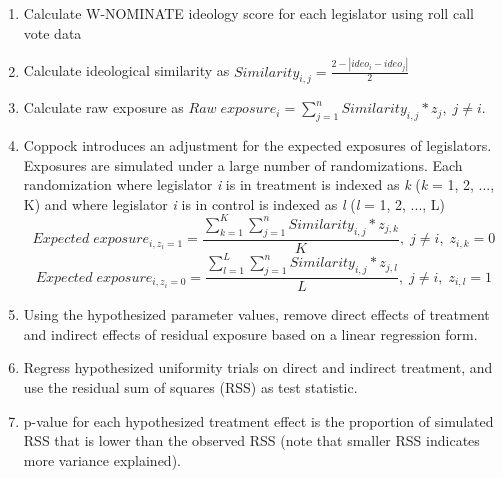 \documentclass[12pt]{article}
\begin{document}
\begin{enumerate}
\item Calculate W-NOMINATE ideology score for each legislator using roll call vote data

\item Calculate ideological similarity as $Similarity_{i,j} = \frac{2 - |ideo_i - ideo_j|}{2}$

\item Calculate raw exposure as $Raw\; exposure_i =  \sum_{j=1}^{n}Similarity_{i,j} * z_j, \; j \neq i$. 

\item Coppock introduces an adjustment for the expected exposures of legislators. Exposures are simulated under a large number of randomizations. Each randomization where legislator \textit{i} is in treatment is indexed as \textit{k} (\textit{k} = 1, 2, ..., K) and where legislator \textit{i} is in control is indexed as \textit{l} (\textit{l} = 1, 2, ..., L) $$Expected \; exposure_{i, z_i=1} =  \frac{\sum_{k=1}^{K}\sum_{j=1}^{n}Similarity_{i,j} * z_{j,k}}{K}, \; j \neq i, \; z_{i,k}=0$$ $$Expected \; exposure_{i, z_i=0} =  \frac{\sum_{l=1}^{L}\sum_{j=1}^{n}Similarity_{i,j} * z_{j,l}}{L}, \; j \neq i, \; z_{i,l}=1$$

\item Using the hypothesized parameter values, remove direct effects of treatment and indirect effects of residual exposure based on a linear regression form.

\item Regress hypothesized uniformity trials on direct and indirect treatment, and use the residual sum of squares (RSS) as test statistic.

\item p-value for each hypothesized treatment effect is the proportion of simulated RSS that is lower than the observed RSS (note that smaller RSS indicates more variance explained).
\end{enumerate}


\subsection{\citet{bergan2015call}}
\end{document}
